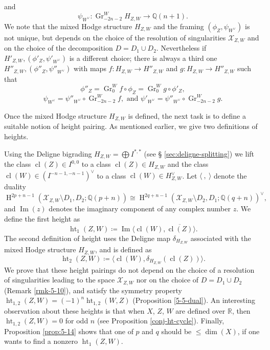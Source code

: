 \documentclass[11pt,a4paper]{amsart}
\newcommand{\Q}{\mathds{Q}}
\newcommand{\R}{\mathds{R}}
\newcommand{\caX}{\mathcal{X}}
\DeclareMathOperator {\Gr} {Gr}
\DeclareMathOperator{\im}{Im}
\DeclareMathOperator {\cl}{cl}
\DeclareMathOperator{\Ht}{ht}
\DeclareMathOperator{\rH}{H}
\numberwithin{equation}{section}
\theoremstyle{plain}
\theoremstyle{definition}
\begin{document}
and
\begin{displaymath}
\psi_{W^{\vee}}\colon \Gr^{W}_{-2n-2}H_{Z,W}\rightarrow \Q(n+1).
\end{displaymath}
We note that the mixed Hodge structure $H_{Z,W}$ and the framing
$(\phi_{Z},\psi_{W^{\vee}})$ is not unique, but depends on the choice
of the resolution of singularities $\caX_{Z,W}$  and on the choice of
the decomposition $D=D_{1}\cup D_{2}$. Nevertheless if $H'_{Z,W},
(\phi'_{Z},\psi'_{W^{\vee}})$ is a different choice; there is always a
third one $H''_{Z,W},
(\phi''_{Z},\psi''_{W^{\vee}})$ with maps $f\colon H_{Z,W}\to
H''_{Z,W}$ and $g\colon H_{Z,W}\to H''_{Z,W}$ such that
\begin{displaymath}
  \phi''_{Z}=\Gr_{0}^{W}f\circ \phi_{Z}=\Gr_{0}^{W}g\circ \phi'_{Z} ,
\end{displaymath}
  \begin{displaymath}
  \psi_{W^{\vee}}=\psi''_{W^{\vee}}\circ
  \Gr_{-2n-2}^{W}f, \text{ and }
\psi'_{W^{\vee}}
  = \psi''_{W^{\vee}}\circ \Gr_{-2n-2}^{W}g. 
\end{displaymath}


Once the mixed Hodge structure $H_{Z,W}$ is defined, the next task is
to define a suitable notion of height pairing. As mentioned earlier, we
give two definitions of heights.

Using the Deligne bigrading $H_{Z,W}=\bigoplus I^{\ast,\ast}$ (see \S
\ref{sec:deligne-splitting}) we 
lift the class $\cl(Z)\in I^{0,0}$ to a class $\cl(Z)\in H_{Z,W}$ and the
class $\cl(W)\in (I^{-n-1,-n-1})^{\vee}$ to a class $\cl(W)\in H_{Z,W}^{\vee}$.
Let $\langle~,~\rangle$ denote the duality
\begin{displaymath}
\rH^{2p+n-1}(\caX_{Z,W}\setminus D_1,D_2;\Q(p+n))\cong
\rH^{2q+n-1}(\caX_{Z,W}\setminus D_2,D_1;\Q(q+n))^{\vee},
\end{displaymath}
and $\im(z)$ denotes the imaginary component of any complex number
$z$. We define the first height as 
\begin{displaymath}
\Ht_{1}(Z,W)\coloneqq \im\langle \cl(W), \overline{\cl(Z)}\rangle.
\end{displaymath}
The second definition of height uses the Deligne map
$\delta_{H_{Z,W}}$ associated with the mixed Hodge structure $H_{Z,W}$,
and is defined as 
\begin{displaymath}
\Ht_{2}(Z,W)\coloneqq \langle \cl(W), \delta_{H_{Z,W}}(\cl(Z))\rangle.
\end{displaymath}
We prove that these height pairings do not depend on the choice of a
resolution of singularities leading to the space $\caX_{Z,W}$ nor on
the choice of $D=D_{1}\cup D_{2}$
  (Remark \ref{rmk-5-10}), and
satisfy the symmetry property $\Ht_{1,2}(Z,W)=(-1)
  ^n\Ht_{1,2}(W,Z)$   (Proposition \ref{5-5-dual}). An interesting
  observation about these heights is that when $X$, $Z$, $W$ are
  defined over $\R$, then $\Ht_{1,2}(Z,W)=0$ for odd $n$ (see
  Proposition \ref{conj-ht-cycle}). Finally, Proposition
  \ref{prop:5-14} shows that one of $p$ and $q$ should be $\leq
  \dim(X)$, if one wants to find a nonzero $\Ht_{1}(Z,W)$.
\end{document}
